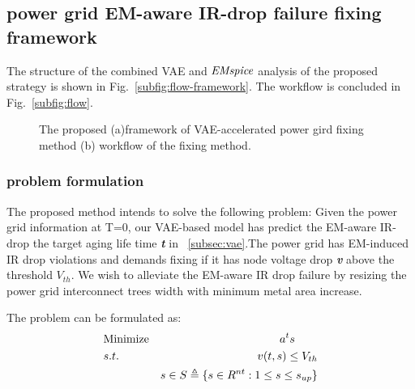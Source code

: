 \subsection{power grid EM-aware IR-drop failure fixing framework }
\label{subsec:formulation}

The structure of the combined VAE and  $\it{EMspice}$ analysis of the proposed strategy is shown in Fig.~\ref{subfig:flow-framework}. The workflow is concluded in Fig.~\ref{subfig:flow}. 

\begin{figure*}[h!]
	\centering
	\captionsetup{justification=centering, margin=3cm}
	\caption{The proposed (a)framework of  VAE-accelerated power gird fixing method (b) workflow of the fixing method.}
	\label{fig:flow}
\end{figure*}



\subsubsection{problem formulation}
\label{subsubsec:formulation}
The proposed method intends to solve the following problem: 
Given the power grid information at T=0, our VAE-based model has predict the EM-aware IR-drop the target aging life time \textit{\textbf{t}} in ~\ref{subsec:vae}.The power grid has EM-induced IR drop violations and demands fixing if it has node voltage drop \textit{\textbf{v}}  above the threshold $V_{th}$.
We wish to alleviate the EM-aware IR drop failure by resizing the power grid interconnect trees width with minimum metal area increase.

The problem can be formulated as:
\begin{align}
	\label{eq:prob_formulation}
	&\mbox{Minimize}  & a^{t}s \qquad   \notag  \\
	&s.t.     & v(t,s)\leq V_{th} \\
	& \quad   &s \in S   \triangleq \{ s \in R^{nt}: 1 \leq s \leq s_{up} \}        \notag
\end{align}

